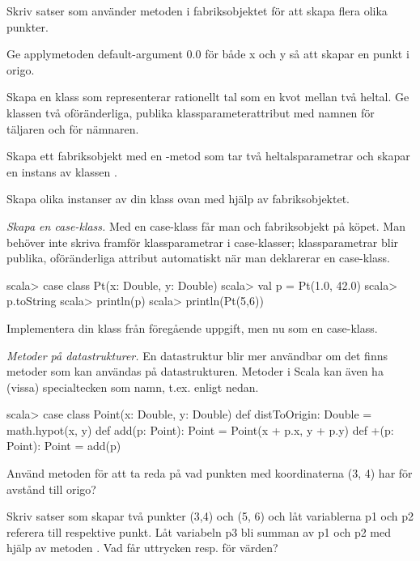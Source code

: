 \Subtask Skriv satser som använder metoden  i fabriksobjektet  för att skapa flera olika punkter.

\Subtask Ge applymetoden default-argument 0.0 för både x och y så att  skapar en punkt i origo.

\Subtask Skapa en klass  som representerar rationellt tal som en kvot mellan två heltal. Ge klassen två oföränderliga, publika klassparameterattribut med namnen  för täljaren och  för nämnaren. 

\Subtask Skapa ett fabriksobjekt med en -metod som tar två heltalsparametrar och skapar en instans av klassen .

\Subtask Skapa olika instanser av din klass  ovan med hjälp av fabriksobjektet.


\Task \emph{Skapa en case-klass.} Med en case-klass får man  och fabriksobjekt på köpet. Man behöver inte skriva  framför klassparametrar i case-klasser; klassparametrar blir publika, oföränderliga attribut automatiskt när man deklarerar en case-klass.

\begin{REPL}
scala> case class Pt(x: Double, y: Double) 
scala> val p = Pt(1.0, 42.0)
scala> p.toString
scala> println(p)
scala> println(Pt(5,6))
\end{REPL}

\Subtask Implementera din klass  från föregående uppgift, men nu som en case-klass.
	
\Task \label{task:point} \emph{Metoder på datastrukturer.} En datastruktur blir mer användbar om det finns metoder som kan användas på datastrukturen. Metoder i Scala kan även ha (vissa) specialtecken som namn, t.ex. \code{+} enligt nedan.  
\begin{REPL}
scala> case class Point(x: Double, y: Double) {
         def distToOrigin: Double = math.hypot(x, y)   
         def add(p: Point): Point = Point(x + p.x, y + p.y)
         def +(p: Point): Point = add(p)
       }
\end{REPL}

\Subtask Använd metoden  för att ta reda på vad punkten med koordinaterna (3, 4) har för avstånd till origo?

\Subtask Skriv satser som skapar två punkter (3,4) och (5, 6) och låt variablerna p1 och p2 referera till respektive punkt. Låt variabeln p3 bli summan av p1 och p2 med hjälp av metoden . Vad får uttrycken  resp.  för värden?



